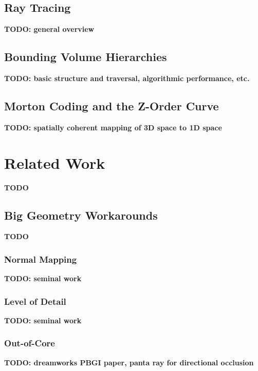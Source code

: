 \documentclass[12pt]{ucthesis}
\begin{document}
\section{Ray Tracing}
\label{raytracing}

\textbf{TODO: general overview}

\section{Bounding Volume Hierarchies}
\label{bvhs}

\textbf{TODO: basic structure and traversal, algorithmic performance, etc.}

\section{Morton Coding and the Z-Order Curve}
\label{morton}

\textbf{TODO: spatially coherent mapping of 3D space to 1D space}

\chapter{Related Work}
\label{relatedwork}

\textbf{TODO}

\section{Big Geometry Workarounds}
\label{managingcomplexity}

\textbf{TODO}

\subsection{Normal Mapping}
\label{normalmaps}

\textbf{TODO: seminal work}

\subsection{Level of Detail}
\label{levelofdetail}

\textbf{TODO: seminal work}

\subsection{Out-of-Core}
\label{outofcore}

\textbf{TODO: dreamworks PBGI paper, panta ray for directional occlusion}
\end{document}
